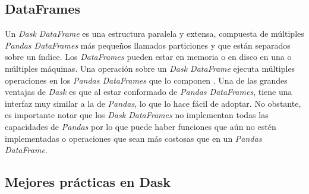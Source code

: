 \subsection{DataFrames}

Un \textit{Dask DataFrame} es una estructura paralela y extensa, compuesta de múltiples \textit{Pandas DataFrames} más pequeños llamados particiones y que están separados sobre un índice. Los \textit{DataFrames} pueden estar en memoria o en disco en una o múltiples máquinas. Una operación sobre un \textit{Dask DataFrame} ejecuta múltiples operaciones en los \textit{Pandas DataFrames} que lo componen \cite{daskdataframe}. Una de las grandes ventajas de \textit{Dask} es que al estar conformado de \textit{Pandas DataFrames}, tiene una interfaz muy similar a la de \textit{Pandas}, lo que lo hace fácil de adoptar. No obstante, es importante notar que los \textit{Dask DataFrames} no implementan todas las capacidades de \textit{Pandas} por lo que puede haber funciones que aún no estén implementadas o operaciones que sean más costosas que en un \textit{Pandas DataFrame}.


\subsection{Mejores prácticas en Dask}

